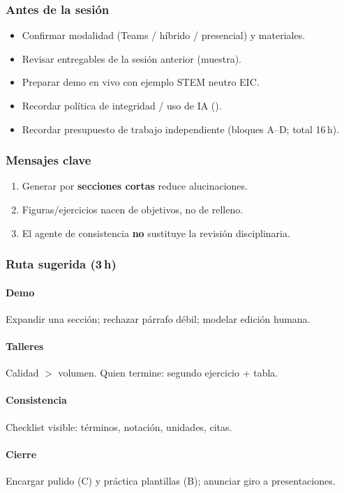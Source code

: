 \subsubsection*{Antes de la sesión}
\begin{itemize}
\item[$\square$] Confirmar modalidad (Teams / híbrido / presencial) y materiales.
\item[$\square$] Revisar entregables de la sesión anterior (muestra).
\item[$\square$] Preparar demo en vivo con ejemplo STEM neutro EIC.
\item[$\square$] Recordar política de integridad / uso de IA (\ceddie).
\item[$\square$] Recordar presupuesto de trabajo independiente (bloques A--D; total 16\,h).
\end{itemize}

\subsubsection*{Mensajes clave}
\begin{enumerate}
\item Generar por \textbf{secciones cortas} reduce alucinaciones.
\item Figuras/ejercicios nacen de objetivos, no de relleno.
\item El agente de consistencia \textbf{no} sustituye la revisión disciplinaria.
\end{enumerate}

\subsubsection*{Ruta sugerida (3\,h)}
\paragraph{Demo} Expandir una sección; rechazar párrafo débil; modelar edición humana.
\paragraph{Talleres} Calidad $>$ volumen. Quien termine: segundo ejercicio + tabla.
\paragraph{Consistencia} Checklist visible: términos, notación, unidades, citas.
\paragraph{Cierre} Encargar pulido (C) y práctica plantillas (B); anunciar giro a presentaciones.

